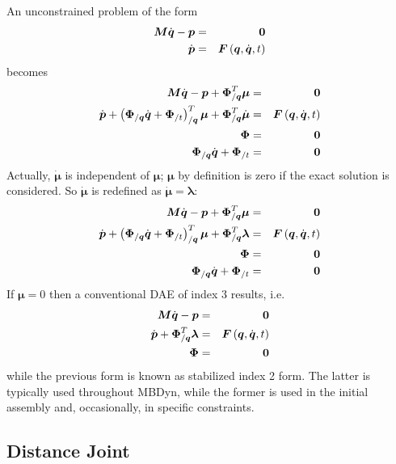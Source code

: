\documentclass[10pt,dvips]{report}
\newcommand{\T}[1]{\boldsymbol{#1}}
\begin{document}
An unconstrained problem of the form
\begin{eqnarray*}
	\T{M} \dot{\T{q}} - \T{p} & = & \T{0} \\
	\dot{\T{p}} & = & \T{F}\plbr{\T{q}, \dot{\T{q}}, t}
\end{eqnarray*}
becomes
\begin{eqnarray*}
	\T{M} \dot{\T{q}} - \T{p} + \T{\Phi}_{/\T{q}}^T \T{\mu} & = & \T{0} \\
	\dot{\T{p}} + \plbr{
		\T{\Phi}_{/\T{q}} \dot{\T{q}}
		+ \T{\Phi}_{/t}
	}_{/\T{q}}^T \T{\mu}
	+ \T{\Phi}_{/\T{q}}^T \dot{\T{\mu}} & = & \T{F}\plbr{\T{q}, \dot{\T{q}}, t} \\
	\T{\Phi} & = & \T{0} \\
	\T{\Phi}_{/\T{q}} \dot{\T{q}} + \T{\Phi}_{/t} & = & \T{0}
\end{eqnarray*}
Actually, $\dot{\T{\mu}}$ is independent of $\T{\mu}$;
$\T{\mu}$ by definition is zero if the exact solution is considered.
So $\dot{\T{\mu}}$ is redefined as $\dot{\T{\mu}}=\T{\lambda}$:
\begin{eqnarray*}
	\T{M} \dot{\T{q}} - \T{p} + \T{\Phi}_{/\T{q}}^T \T{\mu} & = & \T{0} \\
	\dot{\T{p}} + \plbr{
		\T{\Phi}_{/\T{q}} \dot{\T{q}}
		+ \T{\Phi}_{/t}
	}_{/\T{q}}^T \T{\mu} + \T{\Phi}_{/\T{q}}^T \T{\lambda}
		& = & \T{F}\plbr{\T{q}, \dot{\T{q}}, t} \\
	\T{\Phi} & = & \T{0} \\
	\T{\Phi}_{/\T{q}} \dot{\T{q}} + \T{\Phi}_{/t} & = & \T{0}
\end{eqnarray*}
If $\T{\mu}=0$ then a conventional DAE of index 3 results, i.e.
\begin{eqnarray*}
	\T{M} \dot{\T{q}} - \T{p} & = & \T{0} \\
	\dot{\T{p}} + \T{\Phi}_{/\T{q}}^T \T{\lambda}
		& = & \T{F}\plbr{\T{q}, \dot{\T{q}}, t} \\
	\T{\Phi} & = & \T{0}
\end{eqnarray*}
while the previous form is known as stabilized index 2 form.
The latter is typically used throughout MBDyn, while the former is used 
in the initial assembly and, occasionally, in specific constraints.

\subsection{Distance Joint}
\end{document}
